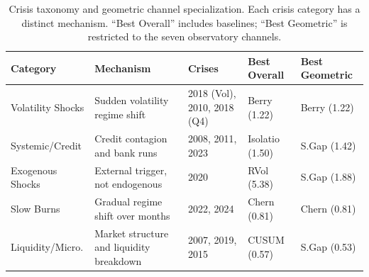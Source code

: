\begin{table}[htbp]
\centering
\caption{Crisis taxonomy and geometric channel specialization. Each crisis category has a distinct mechanism.  ``Best Overall'' includes baselines; ``Best Geometric'' is restricted to the seven observatory channels.}
\label{tab:crisis_taxonomy}
\footnotesize
\setlength{\tabcolsep}{4pt}
\begin{tabular}{lp{3.2cm}lll}
\toprule
Category & Mechanism & Crises & Best Overall & Best Geometric \\
\midrule
Volatility Shocks & Sudden volatility regime shift & 2018 (Vol), 2010, 2018 (Q4) & Berry (1.22) & Berry (1.22) \\
Systemic/Credit & Credit contagion and bank runs & 2008, 2011, 2023 & Isolatio (1.50) & S.Gap (1.42) \\
Exogenous Shocks & External trigger, not endogenous & 2020 & RVol (5.38) & S.Gap (1.88) \\
Slow Burns & Gradual regime shift over months & 2022, 2024 & Chern (0.81) & Chern (0.81) \\
Liquidity/Micro. & Market structure and liquidity breakdown & 2007, 2019, 2015 & CUSUM (0.57) & S.Gap (0.53) \\
\bottomrule
\end{tabular}
\end{table}